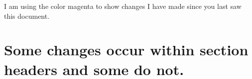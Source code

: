 \documentclass[11pt]{article}
\begin{document}
 

I am using the color magenta to show changes I have made since you last saw this document. 

\section*{Some changes occur within section headers and some do not.} 
\end{document}
